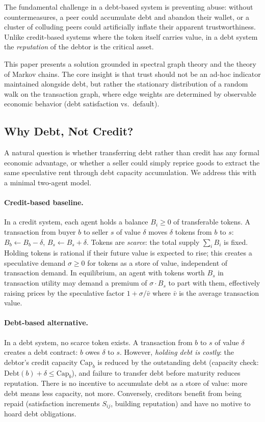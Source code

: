 \documentclass[11pt]{article}
\begin{document}
The fundamental challenge in a debt-based system is preventing abuse: without countermeasures, a peer could accumulate debt and abandon their wallet, or a cluster of colluding peers could artificially inflate their apparent trustworthiness. Unlike credit-based systems where the token itself carries value, in a debt system the \emph{reputation} of the debtor is the critical asset.

This paper presents a solution grounded in spectral graph theory and the theory of Markov chains. The core insight is that trust should not be an ad-hoc indicator maintained alongside debt, but rather the stationary distribution of a random walk on the transaction graph, where edge weights are determined by observable economic behavior (debt satisfaction vs.\ default).

\subsection{Why Debt, Not Credit?}
\label{sec:debt_vs_credit}

A natural question is whether transferring debt rather than credit has any formal economic advantage, or whether a seller could simply reprice goods to extract the same speculative rent through debt capacity accumulation. We address this with a minimal two-agent model.

\paragraph{Credit-based baseline.}
In a credit system, each agent holds a balance $B_i \geq 0$ of transferable tokens. A transaction from buyer $b$ to seller $s$ of value $\delta$ moves $\delta$ tokens from $b$ to $s$: $B_b \leftarrow B_b - \delta$, $B_s \leftarrow B_s + \delta$. Tokens are \emph{scarce}: the total supply $\sum_i B_i$ is fixed. Holding tokens is rational if their future value is expected to rise; this creates a speculative demand $\sigma \geq 0$ for tokens as a store of value, independent of transaction demand. In equilibrium, an agent with tokens worth $B_s$ in transaction utility may demand a premium of $\sigma \cdot B_s$ to part with them, effectively raising prices by the speculative factor $1 + \sigma / \bar{v}$ where $\bar{v}$ is the average transaction value.

\paragraph{Debt-based alternative.}
In a debt system, no scarce token exists. A transaction from $b$ to $s$ of value $\delta$ creates a debt contract: $b$ owes $\delta$ to $s$. However, \emph{holding debt is costly}: the debtor's credit capacity $\text{Cap}_b$ is reduced by the outstanding debt (capacity check: $\text{Debt}(b) + \delta \leq \text{Cap}_b$), and failure to transfer debt before maturity reduces reputation. There is no incentive to accumulate debt as a store of value: more debt means less capacity, not more. Conversely, creditors benefit from being repaid (satisfaction increments $S_{ij}$, building reputation) and have no motive to hoard debt obligations.
\end{document}
